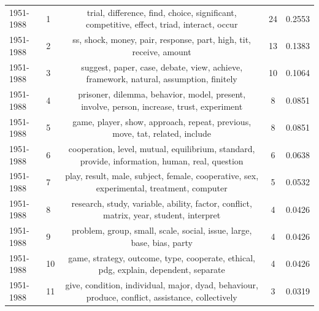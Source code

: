 \documentclass{article}
\theoremstyle{definition}
\begin{document}
\begin{table}[!hbtp]
\begin{center}
{\begin{tabular}{llccc}
             \midrule
             1951-1988 &               1 &                     trial, difference, find, choice, significant, competitive, effect, triad, interact, occur &               24 &                  0.2553 \\
             1951-1988 &               2 &                                            ss, shock, money, pair, response, part, high, tit, receive, amount &               13 &                  0.1383 \\
             1951-1988 &               3 &                         suggest, paper, case, debate, view, achieve, framework, natural, assumption, finitely &               10 &                  0.1064 \\
             1951-1988 &               4 &                     prisoner, dilemma, behavior, model, present, involve, person, increase, trust, experiment &                8 &                  0.0851 \\
             1951-1988 &               5 &                                   game, player, show, approach, repeat, previous, move, tat, related, include &                8 &                  0.0851 \\
             1951-1988 &               6 &                cooperation, level, mutual, equilibrium, standard, provide, information, human, real, question &                6 &                  0.0638 \\
             1951-1988 &               7 &                      play, result, male, subject, female, cooperative, sex, experimental, treatment, computer &                5 &                  0.0532 \\
             1951-1988 &               8 &                        research, study, variable, ability, factor, conflict, matrix, year, student, interpret &                4 &                  0.0426 \\
             1951-1988 &               9 &                                         problem, group, small, scale, social, issue, large, base, bias, party &                4 &                  0.0426 \\
             1951-1988 &              10 &                          game, strategy, outcome, type, cooperate, ethical, pdg, explain, dependent, separate &                4 &                  0.0426 \\
             1951-1988 &              11 &              give, condition, individual, major, dyad, behaviour, produce, conflict, assistance, collectively &                3 &                  0.0319 \\

\end{tabular}}
\end{center}
\end{table}
\end{document}
